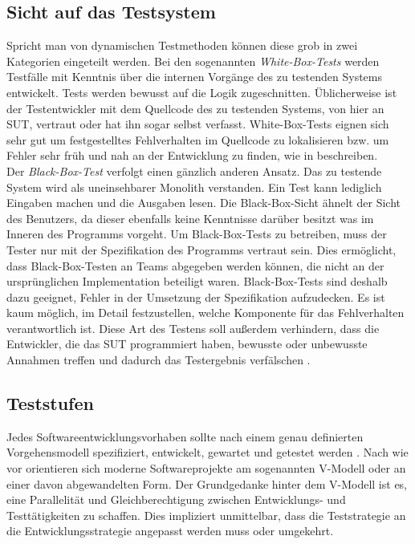 \subsection{Sicht auf das Testsystem}
\label{sec:sicht}
Spricht man von dynamischen Testmethoden können diese grob in zwei Kategorien eingeteilt werden. Bei den sogenannten \textit{White-Box-Tests} werden Testfälle mit Kenntnis über die internen Vorgänge des zu testenden Systems entwickelt. Tests werden bewusst auf die Logik zugeschnitten. Üblicherweise ist der Testentwickler mit dem Quellcode des zu testenden Systems, von hier an \gls{SUT}, vertraut oder hat ihn sogar selbst verfasst. White-Box-Tests eignen sich sehr gut um festgestelltes Fehlverhalten im Quellcode zu lokalisieren bzw. um Fehler sehr früh und nah an der Entwicklung zu finden, wie \citeauthor{spillner_basiswissen_2012} in \cite{spillner_basiswissen_2012} beschreiben.\\
Der \textit{Black-Box-Test} verfolgt einen gänzlich anderen Ansatz. Das zu testende System wird als uneinsehbarer Monolith verstanden. Ein Test kann lediglich Eingaben machen und die Ausgaben lesen. Die Black-Box-Sicht ähnelt der Sicht des Benutzers, da dieser ebenfalls keine Kenntnisse darüber besitzt was im Inneren des Programms vorgeht. Um Black-Box-Tests zu betreiben, muss der Tester nur mit der Spezifikation des Programms vertraut sein. Dies ermöglicht, dass Black-Box-Testen an Teams abgegeben werden können, die nicht an der ursprünglichen Implementation beteiligt waren. Black-Box-Tests sind deshalb dazu geeignet, Fehler in der Umsetzung der Spezifikation aufzudecken. Es ist kaum möglich, im Detail festzustellen, welche Komponente für das Fehlverhalten verantwortlich ist. Diese Art des Testens soll außerdem verhindern, dass die Entwickler, die das \gls{SUT} programmiert haben, bewusste oder unbewusste Annahmen treffen und dadurch das Testergebnis verfälschen \cite{spillner_basiswissen_2012}.  

\subsection{Teststufen}
\label{sec:teststufen}
Jedes Softwareentwicklungsvorhaben sollte nach einem genau definierten Vorgehensmodell spezifiziert, entwickelt, gewartet und getestet werden \cite{spillner_basiswissen_2012}. Nach wie vor orientieren sich moderne Softwareprojekte am sogenannten V-Modell \cite{boehm_verifying_1984} oder an einer davon abgewandelten Form. Der Grundgedanke hinter dem V-Modell ist es, eine Parallelität und Gleichberechtigung zwischen Entwicklungs- und Testtätigkeiten zu schaffen. Dies impliziert unmittelbar, dass die Teststrategie an die Entwicklungsstrategie angepasst werden muss oder umgekehrt.\\

